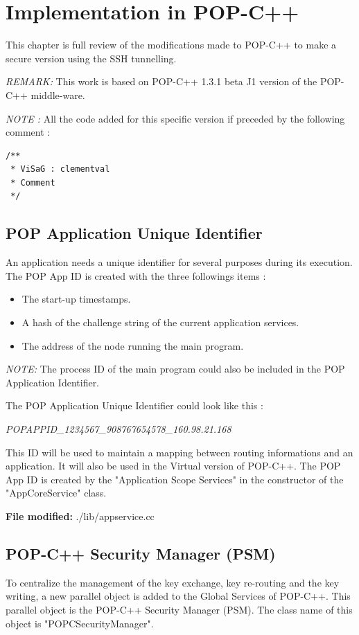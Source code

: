 \pagebreak
\section{Implementation in POP-C++}
This chapter is full review of the modifications made to POP-C++ to make a secure version using the SSH tunnelling. \s

\emph{REMARK:} This work is based on POP-C++ 1.3.1 beta J1 version of the POP-C++ middle-ware.\s

\textit{NOTE : } All the code added for this specific version if preceded by the following comment : 

\begin{lstlisting}
/**
 * ViSaG : clementval
 * Comment
 */
\end{lstlisting}


\subsection{POP Application Unique Identifier}
An application needs a unique identifier for several purposes during its execution. The POP App ID is created with the three followings items : 
\begin{itemize}
\item The start-up timestamps.
\item A hash of the challenge string of the current application services.
\item The address of the node running the main program.
\end{itemize}

\textit{NOTE:} The process ID of the main program could also be included in the POP Application Identifier.

The POP Application Unique Identifier could look like this :\\

\begin{center}
\textit{POPAPPID\_1234567\_908767654578\_160.98.21.168}
\end{center}\s

This ID will be used to maintain a mapping between routing informations and an application. It will also be used in the Virtual version of POP-C++. The POP App ID is created by the "Application Scope Services" in the constructor of the "AppCoreService" class.\s

\textbf{File modified:} ./lib/appservice.cc\s

\subsection{POP-C++ Security Manager (PSM)}
To centralize the management of the key exchange, key re-routing and the key writing, a new parallel object is added to the Global Services of POP-C++. This parallel object is the POP-C++ Security Manager (PSM). The class name of this object is "POPCSecurityManager". \s

